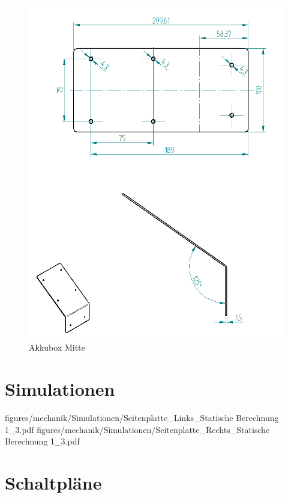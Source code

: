 \label{app:hcis}
\begin{figure} [H]
	\begin{center}
		\includegraphics[scale=0.8]{figures/hcis/befestigung_display_cad.png}
		\caption{Akkubox Mitte}
		\label{fig:panel_cad}
	\end{center}
\end{figure}

\chapter{Simulationen}

 {figures/mechanik/Simulationen/Seitenplatte_Links_Statische Berechnung 1_3.pdf}
 {figures/mechanik/Simulationen/Seitenplatte_Rechts_Statische Berechnung 1_3.pdf}

\newpage

\chapter{Schaltpläne}

